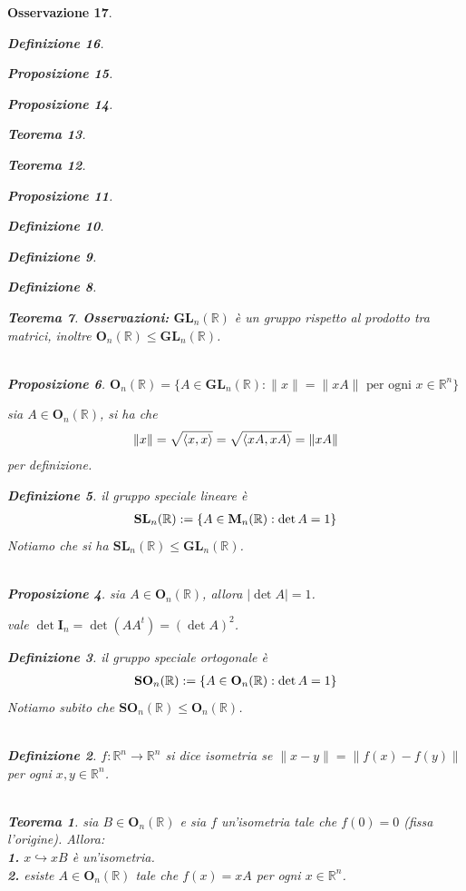 \documentclass[oneside, 11pt]{amsbook}
\makeatletter
\newcommand{\0}{{(0)}}
\newcommand{\3}{{(3)}}
\theoremstyle{colonplain}
\newtheorem{thm}{Teorema}[chapter]
\newtheorem{prop}[thm]{Proposizione}
\theoremstyle{colondefinition}
\newtheorem{defn}[thm]{Definizione}
\theoremstyle{colonremark}
\newtheorem{rmk}[thm]{Osservazione}
\numberwithin{equation}{chapter}
\renewcommand{\proofname}{Dimostrazione}
\renewenvironment{proof}[1][\proofname]{\par
  \pushQED{\end{proof}}%
  \normalfont \topsep6\p@\@plus6\p@\relax
  \trivlist
  \item[\hskip\labelsep\bfseries #1:]\ignorespaces
}{%
  \popQED\endtrivlist\@endpefalse
}
\makeatother
\begin{document}
\begin{rmk}
\begin{defn}
\begin{prop}
\begin{prop}
\begin{thm}
\begin{thm}
\begin{prop}
\begin{defn}
\begin{defn}
\begin{defn}
\begin{thm}
\textbf{Osservazioni:} $\mathbf{GL}_n(\mathbb{R})$ è un gruppo rispetto al prodotto tra matrici, inoltre $\mathbf{O}_n(\mathbb{R}) \leq \mathbf{GL}_n(\mathbb{R})$. \\ \\
\begin{prop} $\mathbf{O}_n(\mathbb{R}) = \{ A \in \mathbf{GL}_n(\mathbb{R}) : \| x \| = \| xA \| \text{ per ogni } x \in \mathbb{R}^n \}$ \\

\begin{proof} sia $A \in \mathbf{O}_n(\mathbb{R})$, si ha che
\begin{align}
    \| x \| = \sqrt{\langle x, x \rangle} = \sqrt{\langle xA, xA \rangle} = \| xA \| \notag
\end{align}
per definizione. \end{proof}
\begin{defn} il \textit{gruppo speciale lineare} è
\begin{align}
    \mathbf{SL}_n(\mathbb{R}) := \{ A \in \mathbf{M}_n(\mathbb{R}) : \det A = 1 \} \notag
\end{align}
Notiamo che si ha $\mathbf{SL}_n(\mathbb{R}) \leq \mathbf{GL}_n(\mathbb{R})$. \\ \\
\begin{prop} sia $A \in \mathbf{O}_n(\mathbb{R})$, allora $|\det A| = 1$. \\

\begin{proof} vale $\det \mathbf{I}_n = \det (AA^t) = (\det A)^2$. \end{proof}
\begin{defn} il \textit{gruppo speciale ortogonale} è
\begin{align}
    \mathbf{SO}_n(\mathbb{R}) := \{ A \in \mathbf{O}_n(\mathbb{R}) : \det A = 1 \} \notag
\end{align}
Notiamo subito che $\mathbf{SO}_n(\mathbb{R}) \leq \mathbf{O}_n(\mathbb{R})$. \\ \\
\begin{defn} $f : \mathbb{R}^n \longrightarrow \mathbb{R}^n$ si dice \textit{isometria} se $\| x - y \| = \| f(x) - f(y) \|$ per ogni $x, y \in \mathbb{R}^n$. \\ \\
\begin{thm} sia $B \in \mathbf{O}_n(\mathbb{R})$ e sia $f$ un'isometria tale che $f(0) = 0$ (fissa l'origine). Allora: \\
\textbf{1.} $x \hookrightarrow xB$ è un'isometria. \\
\textbf{2.} esiste $A \in \mathbf{O}_n(\mathbb{R})$ tale che $f(x) = xA$ per ogni $x \in \mathbb{R}^n$. \\


\end{thm}
\end{defn}
\end{defn}
\end{prop}
\end{defn}
\end{prop}
\end{thm}
\end{defn}
\end{defn}
\end{defn}
\end{prop}
\end{thm}
\end{thm}
\end{prop}
\end{prop}
\end{defn}
\end{rmk}
\end{document}

